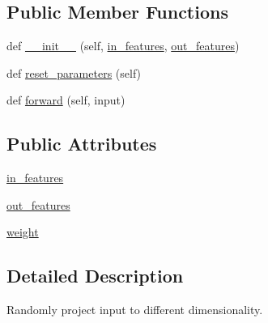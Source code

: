 \subsection*{Public Member Functions}
\begin{DoxyCompactItemize}
\item 
def \hyperlink{classparlai_1_1agents_1_1legacy__agents_1_1seq2seq_1_1modules__v0_1_1RandomProjection_ab509b80358309b000bdd54ff89117ae5}{\+\_\+\+\_\+init\+\_\+\+\_\+} (self, \hyperlink{classparlai_1_1agents_1_1legacy__agents_1_1seq2seq_1_1modules__v0_1_1RandomProjection_a746c126e0335761df8b17d83b11827c6}{in\+\_\+features}, \hyperlink{classparlai_1_1agents_1_1legacy__agents_1_1seq2seq_1_1modules__v0_1_1RandomProjection_a96b2dfcaec3fee60b2874e451474a38c}{out\+\_\+features})
\item 
def \hyperlink{classparlai_1_1agents_1_1legacy__agents_1_1seq2seq_1_1modules__v0_1_1RandomProjection_a8658f06bff792a0c09d106950a6267fe}{reset\+\_\+parameters} (self)
\item 
def \hyperlink{classparlai_1_1agents_1_1legacy__agents_1_1seq2seq_1_1modules__v0_1_1RandomProjection_aa827034c53df417f2eedac25f581a88d}{forward} (self, input)
\end{DoxyCompactItemize}
\subsection*{Public Attributes}
\begin{DoxyCompactItemize}
\item 
\hyperlink{classparlai_1_1agents_1_1legacy__agents_1_1seq2seq_1_1modules__v0_1_1RandomProjection_a746c126e0335761df8b17d83b11827c6}{in\+\_\+features}
\item 
\hyperlink{classparlai_1_1agents_1_1legacy__agents_1_1seq2seq_1_1modules__v0_1_1RandomProjection_a96b2dfcaec3fee60b2874e451474a38c}{out\+\_\+features}
\item 
\hyperlink{classparlai_1_1agents_1_1legacy__agents_1_1seq2seq_1_1modules__v0_1_1RandomProjection_a6564c7d7b6296013fc59706c0c32267e}{weight}
\end{DoxyCompactItemize}


\subsection{Detailed Description}
\begin{DoxyVerb}Randomly project input to different dimensionality.
\end{DoxyVerb}
 

